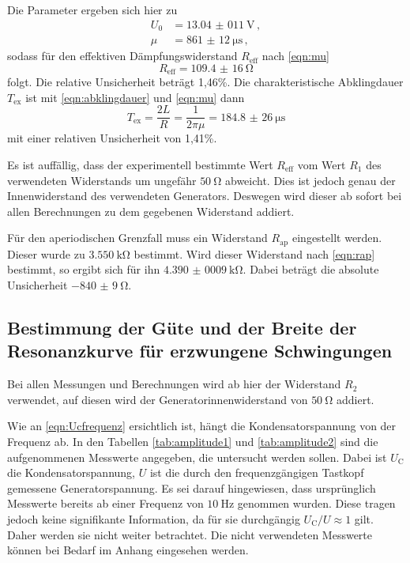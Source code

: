 Die Parameter ergeben sich hier zu
\begin{align*}
  U_0 &= \SI{13,04(011)}{\volt}\,, \\
  \mu &= \SI{861(12)}{\micro\second}\,,
\end{align*}
sodass für den effektiven Dämpfungswiderstand $R_\text{eff}$ nach \eqref{eqn:mu}
\begin{equation*}
  R_\text{eff} = \SI{109,4(16)}{\ohm}
\end{equation*}
folgt. Die relative Unsicherheit beträgt 1,46\%. Die charakteristische
Abklingdauer $T_\text{ex}$ ist mit \eqref{eqn:abklingdauer} und \eqref{eqn:mu} dann
\begin{equation*}
  T_\text{ex} = \frac{2L}{R} = \frac{1}{2\pi \mu} = \SI{184,8(26)}{\micro\second}
\end{equation*}
mit einer relativen Unsicherheit von 1,41\%.

Es ist auffällig, dass der experimentell bestimmte Wert $R_\text{eff}$ vom Wert $R_1$ des verwendeten
Widerstands um ungefähr $\SI{50}{\ohm}$ abweicht. Dies ist jedoch genau der Innenwiderstand
des verwendeten Generators. Deswegen wird dieser ab sofort bei allen Berechnungen zu dem
gegebenen Widerstand addiert.

Für den aperiodischen Grenzfall muss ein Widerstand $R_\text{ap}$ eingestellt werden.
Dieser wurde zu $\SI{3,550}{\kilo\ohm}$ bestimmt. Wird dieser Widerstand nach
\eqref{eqn:rap} bestimmt, so ergibt sich für ihn $\SI{4,390(0009)}{\kilo\ohm}$.
Dabei beträgt die absolute Unsicherheit $\SI{-840(9)}{\ohm}$.

\subsection{Bestimmung der Güte und der Breite der Resonanzkurve für erzwungene Schwingungen}
Bei allen Messungen und Berechnungen wird ab hier der Widerstand $R_2$ verwendet,
auf diesen wird der Generatorinnenwiderstand von $\SI{50}{\ohm}$ addiert.

Wie an \eqref{eqn:Ucfrequenz} ersichtlich ist, hängt die Kondensatorspannung von
der Frequenz ab. In den Tabellen \ref{tab:amplitude1} und \ref{tab:amplitude2} sind die aufgenommenen Messwerte
angegeben, die untersucht werden sollen. Dabei ist $U_\text{C}$ die Kondensatorspannung,
$U$ ist die durch den frequenzgängigen Tastkopf gemessene Generatorspannung.
Es sei darauf hingewiesen, dass ursprünglich Messwerte bereits ab einer
Frequenz von $\SI{10}{\hertz}$ genommen wurden. Diese tragen jedoch keine
signifikante Information, da für sie durchgängig $U_\text{C}/U \approx 1$ gilt.
Daher werden sie nicht weiter betrachtet. Die nicht verwendeten Messwerte können
bei Bedarf im Anhang eingesehen werden.

